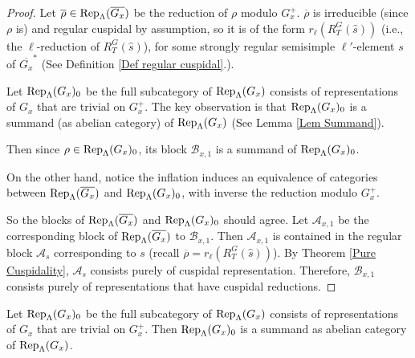 	\begin{proof}
		Let $\overline{\rho} \in \operatorname{\operatorname{Rep}}_{\Lambda}(\overline{G_x})$ be the reduction of $\rho$ modulo $G_x^+$. $\overline{\rho}$ is irreducible (since $\rho$ is) and regular cuspidal by assumption, so it is of the form $r_{\ell}(R_T^G(\hat{s}))$ (i.e., the $\ell$-reduction of $R_T^G(\hat{s})$), for some strongly regular semisimple $\ell'$-element $s$ of $\overline{G_x}^*$ (See Definition \ref{Def regular cuspidal}.). 
		
		Let $\operatorname{\operatorname{Rep}}_{\Lambda}(G_x)_0$ be the full subcategory of $\operatorname{\operatorname{Rep}}_{\Lambda}(G_x)$ consists of representations of $G_x$ that are trivial on $G_x^+$. The key observation is that $\operatorname{\operatorname{Rep}}_{\Lambda}(G_x)_0$ is a summand (as abelian category) of $\operatorname{\operatorname{Rep}}_{\Lambda}(G_x)$ (See Lemma \ref{Lem Summand}).
		
		Then since $\rho \in \operatorname{\operatorname{Rep}}_{\Lambda}(G_x)_0$, its block $\mathcal{B}_{x,1}$ is a summand of $\operatorname{\operatorname{Rep}}_{\Lambda}(G_x)_0$.
		
		On the other hand, notice the inflation induces an equivalence of categories between $\operatorname{\operatorname{Rep}}_{\Lambda}(\overline{G_x})$ and $\operatorname{\operatorname{Rep}}_{\Lambda}(G_x)_0$, with inverse the reduction modulo $G_x^+$.
		
		So the blocks of $\operatorname{\operatorname{Rep}}_{\Lambda}(\overline{G_x})$ and $\operatorname{\operatorname{Rep}}_{\Lambda}(G_x)_0$ should agree. Let $\mathcal{A}_{x,1}$ be the corresponding block of $\operatorname{\operatorname{Rep}}_{\Lambda}(\overline{G_x})$ to $\mathcal{B}_{x,1}$. Then $\mathcal{A}_{x,1}$ is contained in the regular block $\mathcal{A}_s$ corresponding to $s$ (recall $\overline{\rho}=r_{\ell}(R_T^G(\hat{s}))$). By Theorem \ref{Pure Cuspidality}, $\mathcal{A}_s$ consists purely of cuspidal representation. Therefore, $\mathcal{B}_{x,1}$ consists purely of representations that have cuspidal reductions. 
	\end{proof}
	
	\begin{lemma}\label{Lem Summand}
		Let $\operatorname{\operatorname{Rep}}_{\Lambda}(G_x)_0$ be the full subcategory of $\operatorname{\operatorname{Rep}}_{\Lambda}(G_x)$ consists of representations of $G_x$ that are trivial on $G_x^+$. Then $\operatorname{\operatorname{Rep}}_{\Lambda}(G_x)_0$ is a summand as abelian category of $\operatorname{\operatorname{Rep}}_{\Lambda}(G_x)$.
	\end{lemma}
	
